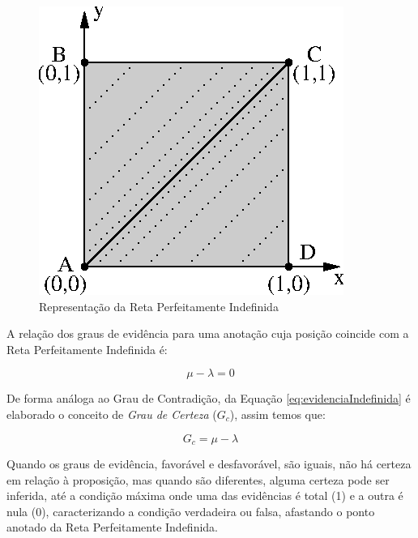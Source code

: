 \begin{figure}[!htb]
\center\includegraphics[scale=1.25]{./pic/C426retaPerfeitamenteIndefinida.eps}
\caption{Representação da Reta Perfeitamente Indefinida}
\label{fig:retaPerfeitamenteIndefinida}
\end{figure}

A relação dos graus de evidência para uma anotação cuja posição coincide com a Reta Perfeitamente Indefinida é: 

\begin{center}
\begin{equation}
\mu - \lambda = 0
\label{eq:evidenciaIndefinida}
\end{equation}
\end{center}

De forma análoga ao Grau de Contradição, da Equação \ref{eq:evidenciaIndefinida} é elaborado o conceito de \emph{Grau de Certeza} ($G _c$), assim temos que: 

\begin{center}
\begin{equation}
G _{c} = \mu - \lambda
\label{eq:grauCerteza}
\end{equation}
\end{center}

Quando os graus de evidência, favorável e desfavorável, são iguais, não há certeza em relação à proposição, mas quando são diferentes, alguma certeza pode ser inferida, até a condição máxima onde uma das evidências é total (1) e a outra é nula (0), caracterizando a condição verdadeira ou falsa, afastando o ponto anotado da Reta Perfeitamente Indefinida. 

